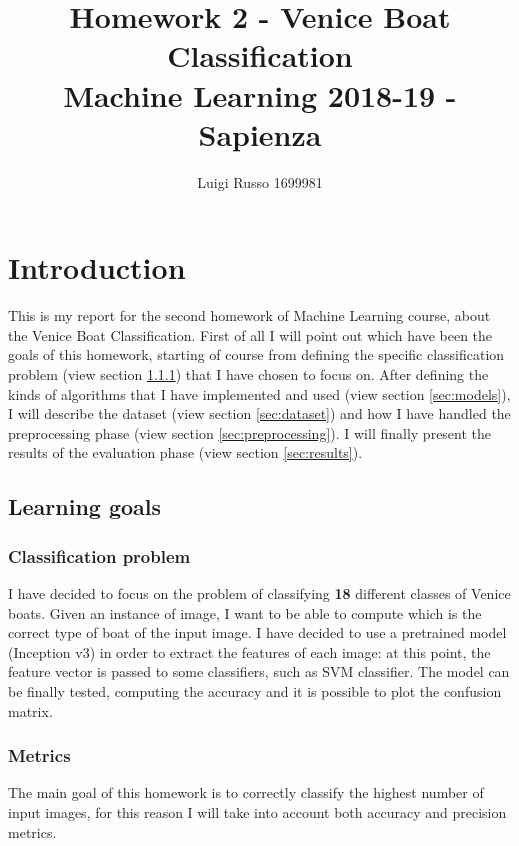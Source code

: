 \documentclass[12pt]{article}
\title{Homework 2 - Venice Boat Classification\\
	\large Machine Learning 2018-19 - Sapienza}
\author{Luigi Russo 1699981}
\begin{document}
	
\maketitle
\newpage
\tableofcontents
\newpage
\section{Introduction}
This is my report for the second homework of Machine Learning course, about the Venice Boat Classification. First of all I will point out which have been the goals of this homework, starting of course from defining the specific classification problem (view section \ref{sec:image_classification_problem}) that I have chosen to focus on. After defining the kinds of algorithms that I have implemented and used (view section \ref{sec:models}), I will describe the dataset (view section \ref{sec:dataset}) and how I have handled the preprocessing phase (view section \ref{sec:preprocessing}). I will finally present the results of the evaluation phase (view section \ref{sec:results}).

\subsection{Learning goals}
\subsubsection{Classification problem}
\label{sec:image_classification_problem}
I have decided to focus on the problem of classifying \textbf{18} different classes of Venice boats. Given an instance of image, I want to be able to compute which is the correct type of boat of the input image. I have decided to use a pretrained model (Inception v3) in order to extract the features of each image: at this point, the feature vector is passed to some classifiers, such as SVM classifier. The model can be finally tested, computing the accuracy and it is possible to plot the confusion matrix.
\subsubsection{Metrics}
The main goal of this homework is to correctly classify the highest number of input images, for this reason I will take into account both accuracy and precision metrics.
\end{document}
